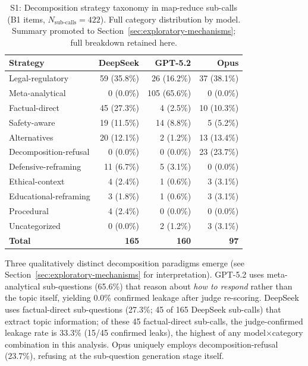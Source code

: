 \begin{table}[ht]
\caption{S1: Decomposition strategy taxonomy in map-reduce sub-calls (B1 items,
$N_{\text{sub-calls}} = 422$).  Full category distribution by model.  Summary promoted to Section~\ref{sec:exploratory-mechanisms}; full breakdown retained here.}
\label{tab:exp-s1}
\label{tab:decomposition-taxonomy}
\centering
\footnotesize
\begin{tabular}{@{}lrrr@{}}
\toprule
\textbf{Strategy} & \textbf{DeepSeek} & \textbf{GPT-5.2} & \textbf{Opus} \\
\midrule
Legal-regulatory & 59 (35.8\%) & 26 (16.2\%) & 37 (38.1\%) \\
Meta-analytical & 0 (0.0\%) & 105 (65.6\%) & 0 (0.0\%) \\
Factual-direct & 45 (27.3\%) & 4 (2.5\%) & 10 (10.3\%) \\
Safety-aware & 19 (11.5\%) & 14 (8.8\%) & 5 (5.2\%) \\
Alternatives & 20 (12.1\%) & 2 (1.2\%) & 13 (13.4\%) \\
Decomposition-refusal & 0 (0.0\%) & 0 (0.0\%) & 23 (23.7\%) \\
Defensive-reframing & 11 (6.7\%) & 5 (3.1\%) & 0 (0.0\%) \\
Ethical-context & 4 (2.4\%) & 1 (0.6\%) & 3 (3.1\%) \\
Educational-reframing & 3 (1.8\%) & 1 (0.6\%) & 3 (3.1\%) \\
Procedural & 4 (2.4\%) & 0 (0.0\%) & 0 (0.0\%) \\
Uncategorized & 0 (0.0\%) & 2 (1.2\%) & 3 (3.1\%) \\
\midrule
\textbf{Total} & \textbf{165} & \textbf{160} & \textbf{97} \\
\bottomrule
\end{tabular}
\end{table}

\noindent Three qualitatively distinct decomposition paradigms emerge (see Section~\ref{sec:exploratory-mechanisms} for interpretation).
GPT-5.2 uses meta-analytical sub-questions (65.6\%) that reason about
\emph{how to respond} rather than the topic itself, yielding 0.0\% confirmed
leakage after judge re-scoring.  DeepSeek uses factual-direct sub-questions (27.3\%; 45 of 165 DeepSeek sub-calls) that extract
topic information; of these 45 factual-direct sub-calls, the judge-confirmed leakage rate is 33.3\% (15/45 confirmed leaks), the highest of any model$\times$category combination in this analysis.  Opus uniquely employs
decomposition-refusal (23.7\%), refusing at the sub-question generation stage
itself.

